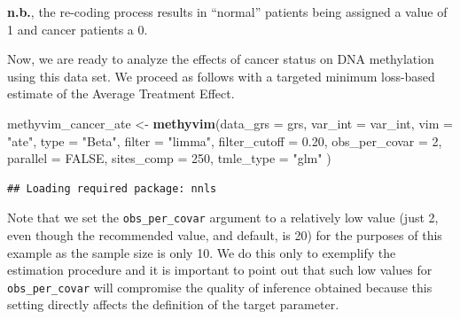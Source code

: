 \documentclass[9pt,a4paper,]{extarticle}
\newenvironment{Shaded}{\begin{snugshade}}{\end{snugshade}}
\newcommand{\DataTypeTok}[1]{\textcolor[rgb]{0.13,0.29,0.53}{#1}}
\newcommand{\DecValTok}[1]{\textcolor[rgb]{0.00,0.00,0.81}{#1}}
\newcommand{\FloatTok}[1]{\textcolor[rgb]{0.00,0.00,0.81}{#1}}
\newcommand{\KeywordTok}[1]{\textcolor[rgb]{0.13,0.29,0.53}{\textbf{#1}}}
\newcommand{\NormalTok}[1]{#1}
\newcommand{\OperatorTok}[1]{\textcolor[rgb]{0.81,0.36,0.00}{\textbf{#1}}}
\newcommand{\OtherTok}[1]{\textcolor[rgb]{0.56,0.35,0.01}{#1}}
\newcommand{\StringTok}[1]{\textcolor[rgb]{0.31,0.60,0.02}{#1}}
\theoremstyle{definition}
\theoremstyle{definition}
\theoremstyle{definition}
\theoremstyle{remark}
\begin{document}
\begin{Shaded}
\end{Shaded}

\textbf{n.b.}, the re-coding process results in ``normal'' patients being assigned a
value of 1 and cancer patients a 0.

Now, we are ready to analyze the effects of cancer status on DNA methylation
using this data set. We proceed as follows with a targeted minimum loss-based
estimate of the Average Treatment Effect.

\begin{Shaded}
\begin{Highlighting}[]
\NormalTok{methyvim_cancer_ate <-}\StringTok{ }\KeywordTok{methyvim}\NormalTok{(}\DataTypeTok{data_grs =}\NormalTok{ grs, }\DataTypeTok{var_int =}\NormalTok{ var_int,}
                                \DataTypeTok{vim =} \StringTok{"ate"}\NormalTok{, }\DataTypeTok{type =} \StringTok{"Beta"}\NormalTok{, }\DataTypeTok{filter =} \StringTok{"limma"}\NormalTok{,}
                                \DataTypeTok{filter_cutoff =} \FloatTok{0.20}\NormalTok{, }\DataTypeTok{obs_per_covar =} \DecValTok{2}\NormalTok{,}
                                \DataTypeTok{parallel =} \OtherTok{FALSE}\NormalTok{, }\DataTypeTok{sites_comp =} \DecValTok{250}\NormalTok{,}
                                \DataTypeTok{tmle_type =} \StringTok{"glm"}
\NormalTok{                               )}
\end{Highlighting}
\end{Shaded}

\begin{verbatim}
## Loading required package: nnls
\end{verbatim}

Note that we set the \texttt{obs\_per\_covar} argument to a relatively low value (just 2,
even though the recommended value, and default, is 20) for the purposes of this
example as the sample size is only 10. We do this only to exemplify the
estimation procedure and it is important to point out that such low values for
\texttt{obs\_per\_covar} will compromise the quality of inference obtained because this
setting directly affects the definition of the target parameter.
\end{document}
